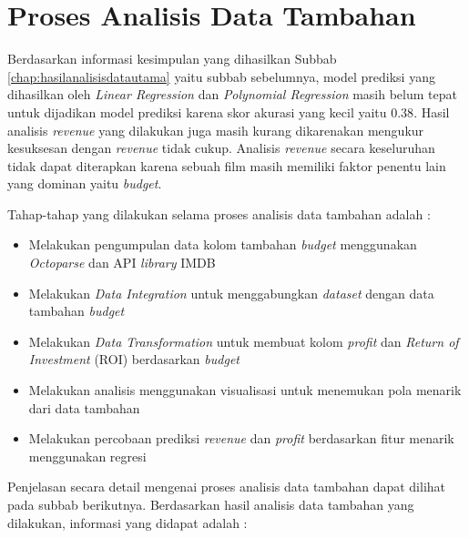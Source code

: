 \section{Proses Analisis Data Tambahan}
\label{chap:hasilanalisisdatatambahan}
Berdasarkan informasi kesimpulan yang dihasilkan Subbab \ref{chap:hasilanalisisdatautama} yaitu subbab sebelumnya, model prediksi yang dihasilkan oleh \textit{Linear Regression} dan \textit{Polynomial Regression} masih belum tepat untuk dijadikan model prediksi karena skor akurasi yang kecil yaitu  $0.38$. Hasil analisis \textit{revenue} yang dilakukan juga masih kurang dikarenakan mengukur kesuksesan dengan \textit{revenue} tidak cukup. Analisis \textit{revenue} secara keseluruhan tidak dapat diterapkan karena sebuah film masih memiliki faktor penentu lain yang dominan yaitu \textit{budget}.

Tahap-tahap yang dilakukan selama proses analisis data tambahan adalah : 
\begin{itemize}
\item Melakukan pengumpulan data kolom tambahan \textit{budget} menggunakan \textit{Octoparse} dan API \textit{library} IMDB
\item Melakukan \textit{Data Integration} untuk menggabungkan \textit{dataset} dengan data tambahan \textit{budget}
\item Melakukan \textit{Data Transformation} untuk membuat kolom \textit{profit} dan \textit{Return of Investment} (ROI) berdasarkan \textit{budget} 
\item Melakukan analisis menggunakan visualisasi untuk menemukan pola menarik dari data tambahan 
\item  Melakukan percobaan prediksi \textit{revenue} dan \textit{profit} berdasarkan fitur menarik menggunakan regresi
\end{itemize}


Penjelasan secara detail mengenai proses analisis data tambahan dapat dilihat pada subbab berikutnya. Berdasarkan hasil analisis data tambahan yang dilakukan, informasi yang didapat adalah :

